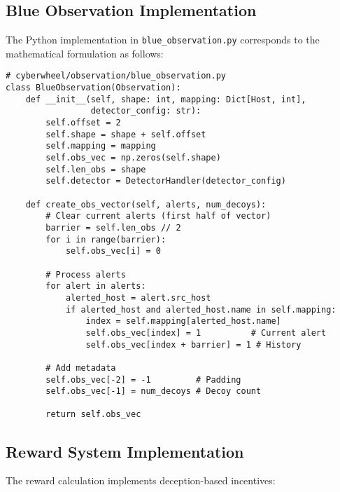 \documentclass[12pt,a4paper]{article}
\begin{document}
\subsection{Blue Observation Implementation}
The Python implementation in \texttt{blue\_observation.py} corresponds to the mathematical formulation as follows:

\begin{lstlisting}[caption=Blue Observation Vector Construction]
# cyberwheel/observation/blue_observation.py
class BlueObservation(Observation):
    def __init__(self, shape: int, mapping: Dict[Host, int], 
                 detector_config: str):
        self.offset = 2
        self.shape = shape + self.offset
        self.mapping = mapping
        self.obs_vec = np.zeros(self.shape)
        self.len_obs = shape
        self.detector = DetectorHandler(detector_config)

    def create_obs_vector(self, alerts, num_decoys):
        # Clear current alerts (first half of vector)
        barrier = self.len_obs // 2
        for i in range(barrier):
            self.obs_vec[i] = 0
        
        # Process alerts
        for alert in alerts:
            alerted_host = alert.src_host
            if alerted_host and alerted_host.name in self.mapping:
                index = self.mapping[alerted_host.name]
                self.obs_vec[index] = 1          # Current alert
                self.obs_vec[index + barrier] = 1 # History
        
        # Add metadata
        self.obs_vec[-2] = -1         # Padding
        self.obs_vec[-1] = num_decoys # Decoy count
        
        return self.obs_vec
\end{lstlisting}

\subsection{Reward System Implementation}
The reward calculation implements deception-based incentives:
\end{document}
